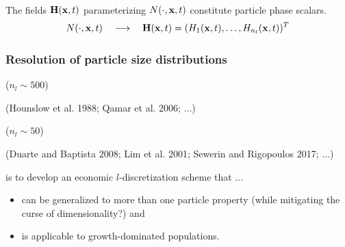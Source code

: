 \documentclass[10pt,xcolor=dvipsnames]{beamer}
\newcommand*{\itemskip}{0.25\baselineskip}
\begin{document}
\begin{frame}[t]
  \\
  \justifying The fields ${\mathbf H}({\mathbf x}, t)$ parameterizing $N(\cdot, {\mathbf x}, t)$ constitute particle phase scalars.
  \begin{equation*}
    N(\cdot, {\mathbf x}, t) \quad\longrightarrow\quad {\mathbf H}({\mathbf x}, t) = (H_1({\mathbf x}, t), \ldots, H_{n_l}({\mathbf x}, t))^T
  \end{equation*}

\end{frame}


\begin{frame}[t]

  \frametitle{Resolution of particle size distributions}

  \vspace{-\baselineskip}
  \begin{minipage}[t]{0.46\columnwidth}\vskip0pt
   ($n_l \sim 500$)
  \begin{center}
  \resizebox{0.65\columnwidth}{!}{}
  \end{center}
  \vspace{-\baselineskip}
  {\footnotesize(Hounslow et al. 1988; Qamar et al. 2006; ...)} \nocite{Hounslow1988, Qamar2006}
  \end{minipage}\hfill
  \begin{minipage}[t]{0.46\columnwidth}\vskip0pt
   ($n_l \sim 50$)
  \begin{center}
  \resizebox{0.65\columnwidth}{!}{}
  \end{center}
  \vspace{-\baselineskip}
  {\footnotesize(Duarte and Baptista 2008; Lim et al. 2001; Sewerin and Rigopoulos 2017; ...)} \nocite{Lim2001, Duarte2008, Sewerin2017}
  \end{minipage}
  \vspace{\baselineskip}

   is to develop an economic $l$-discretization scheme that ...
  \begin{itemize}
  \vspace{\itemskip}
  \item\justifying can be generalized to more than one particle property (while mitigating the curse of dimensionality?) and
  \vspace{\itemskip}
  \item is applicable to growth-dominated populations.
  \end{itemize}


\end{frame}
\end{document}
